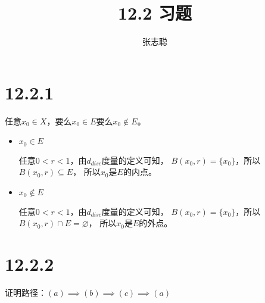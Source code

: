 \documentclass{article}
\begin{document}
\title{12.2 习题}
\author{张志聪}
\maketitle

\section*{12.2.1}

任意$x_0 \in X$，要么$x_0 \in E$要么$x_0 \notin E$。

\begin{itemize}
      \item $x_0 \in E$

            任意$0 < r < 1$，由$d_{disc}$度量的定义可知，
            $B(x_0, r) = \{x_0\}$，所以$B(x_0, r) \subseteq E$，
            所以$x_0$是$E$的内点。

      \item $x_0 \notin E$

            任意$0 < r < 1$，由$d_{disc}$度量的定义可知，
            $B(x_0, r) = \{x_0\}$，所以$B(x_0, r) \cap E = \varnothing$，
            所以$x_0$是$E$的外点。
\end{itemize}

\section*{12.2.2}

证明路径：$(a) \implies (b) \implies (c) \implies (a)$
\end{document}
